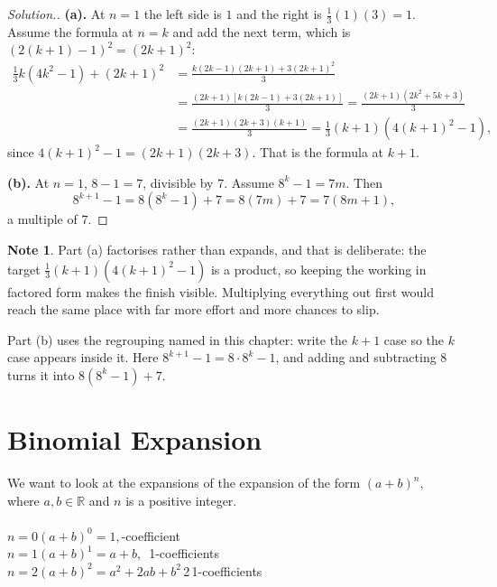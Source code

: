 \documentclass[11pt,a4paper]{article}
\theoremstyle{definition}
\newtheorem{note}[thm]{Note}
\newenvironment{solution}
  {\renewcommand{\qedsymbol}{}\begin{proof}[\textit{Solution}.]}
  {\end{proof}}
\begin{document}
\begin{solution}
\textbf{(a).} At $n=1$ the left side is $1$ and the right is
$\frac{1}{3}(1)(3)=1$. Assume the formula at $n=k$ and add the next term, which is
$\left(2(k+1)-1\right)^{2}=(2k+1)^{2}$:
\begin{align*}
\frac{1}{3}k\left(4k^{2}-1\right)+(2k+1)^{2}
&=\frac{k(2k-1)(2k+1)+3(2k+1)^{2}}{3}\\
&=\frac{(2k+1)\left[k(2k-1)+3(2k+1)\right]}{3}
 =\frac{(2k+1)\left(2k^{2}+5k+3\right)}{3}\\
&=\frac{(2k+1)(2k+3)(k+1)}{3}
 =\frac{1}{3}(k+1)\left(4(k+1)^{2}-1\right),
\end{align*}
since $4(k+1)^{2}-1=(2k+1)(2k+3)$. That is the formula at $k+1$.

\textbf{(b).} At $n=1$, $8-1=7$, divisible by $7$. Assume $8^{k}-1=7m$. Then
$$8^{k+1}-1=8\left(8^{k}-1\right)+7=8(7m)+7=7(8m+1),$$
a multiple of $7$.
\end{solution}

\begin{note}
Part (a) factorises rather than expands, and that is deliberate: the target
$\frac{1}{3}(k+1)\left(4(k+1)^{2}-1\right)$ is a product, so keeping the working in
factored form makes the finish visible. Multiplying everything out first would
reach the same place with far more effort and more chances to slip.

Part (b) uses the regrouping named in this chapter: write the $k+1$ case so the $k$
case appears inside it. Here $8^{k+1}-1=8\cdot 8^{k}-1$, and adding and subtracting
$8$ turns it into $8\left(8^{k}-1\right)+7$.
\end{note}

\pagebreak
\section{Binomial Expansion}
We want to look at the expansions of the expansion of the form $(a+b)^n,$ where $a,b\in \mathbb{R}$ and $n$ is a positive integer.\\\\

$n=0$\quad  $(a+b)^0=1,$-coefficient\\

$n=1$\quad  $(a+b)^1=a+b,$\, 1-coefficients\\

$n=2$\quad  $(a+b)^2=a^2+2ab+b^2$\,2\,1-coefficients\\\\
\end{document}
